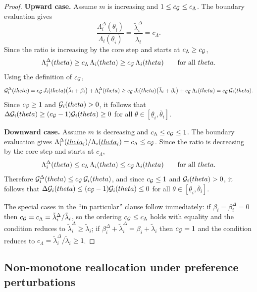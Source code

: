 \documentclass[master.tex]{subfiles}
\begin{document}
\begin{proof}
\noindent\textbf{Upward case.} Assume $m$ is increasing and $1\le c_{\mathcal{G}}\le c_\Lambda$. The boundary evaluation gives
\[
\frac{\Lambda_i^\Delta(\underline\theta_i)}{\Lambda_i(\underline\theta_i)} = \frac{\tilde\lambda_i^\Delta}{\tilde\lambda_i} = c_\Lambda.
\]
Since the ratio is increasing by the core step and starts at $c_\Lambda \ge c_{\mathcal{G}}$,
\[
\Lambda_i^\Delta(theta) \ge c_\Lambda\,\Lambda_i(theta) \ge c_{\mathcal{G}}\,\Lambda_i(theta) \qquad \text{for all }theta.
\]
Using the definition of $c_{\mathcal{G}}$,
\[
\mathcal{G}_i^\Delta(theta) = c_{\mathcal{G}}\,J_i(theta)\bigl(\tilde\lambda_i+\beta_i\bigr)+\Lambda_i^\Delta(theta) \ge c_{\mathcal{G}}\,J_i(theta)\bigl(\tilde\lambda_i+\beta_i\bigr)+c_{\mathcal{G}}\,\Lambda_i(theta) = c_{\mathcal{G}}\,\mathcal{G}_i(theta).
\]
Since $c_{\mathcal{G}}\ge 1$ and $\mathcal{G}_i(theta)>0$, it follows that $\Delta\mathcal{G}_i(theta) \ge (c_{\mathcal{G}}-1)\mathcal{G}_i(theta) \ge 0$ for all $\theta\in[\underline\theta_i,\overline\theta_i]$.


\noindent\textbf{Downward case.} Assume $m$ is decreasing and $c_\Lambda\le c_{\mathcal{G}}\le 1$. The boundary evaluation gives $\Lambda_i^\Delta(\underline{theta}_i)/\Lambda_i(\underline{theta}_i) = c_\Lambda \le c_{\mathcal{G}}$. Since the ratio is decreasing by the core step and starts at $c_\Lambda$,
\[
\Lambda_i^\Delta(theta) \le c_\Lambda\,\Lambda_i(theta) \le c_{\mathcal{G}}\,\Lambda_i(theta) \qquad \text{for all }theta.
\]
Therefore $\mathcal{G}_i^\Delta(theta) \le c_{\mathcal{G}}\,\mathcal{G}_i(theta)$, and since $c_{\mathcal{G}}\le 1$ and $\mathcal{G}_i(theta)>0$, it follows that $\Delta\mathcal{G}_i(theta) \le (c_{\mathcal{G}}-1)\mathcal{G}_i(theta) \le 0$ for all $\theta\in[\underline\theta_i,\overline\theta_i]$.


The special cases in the ``in particular'' clause follow immediately: if $\beta_i=\beta_i^{\Delta}=0$ then $c_{\mathcal{G}}=c_\Lambda=\tilde\lambda_i^\Delta/\tilde\lambda_i$, so the ordering $c_{\mathcal{G}}\le c_\Lambda$ holds with equality and the condition reduces to $\tilde\lambda_i^\Delta\ge\tilde\lambda_i$; if $\beta_i^{\Delta}+\tilde\lambda_i^\Delta=\beta_i+\tilde\lambda_i$ then $c_{\mathcal{G}}=1$ and the condition reduces to $c_\Lambda=\tilde\lambda_i^\Delta/\tilde\lambda_i\ge 1$.
\qedhere
\end{proof}

\subsection{Non-monotone reallocation under preference perturbations}
\end{document}

